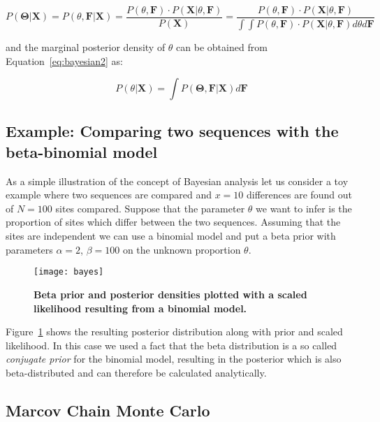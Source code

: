\begin{equation}
P\left(\mathbf{\Theta}|\mathbf{X}\right)=P\left(\theta,\mathbf{F}|\mathbf{X}\right)=\frac{P\left(\theta,\mathbf{F}\right)\cdot P\left(\mathbf{X}|\theta,\mathbf{F}\right)}{P\left(\mathbf{X}\right)}=\frac{P\left(\theta,\mathbf{F}\right)\cdot P\left(\mathbf{X}|\theta,\mathbf{F}\right)}{\int\int P(\theta,\mathbf{F})\cdot P\left(\mathbf{X}|\theta,\mathbf{F}\right)d\theta d\mathbf{F}}
\label{eq:bayesian2}
\end{equation}

\noindent
and the marginal posterior density of $\theta$ can be obtained from Equation~\ref{eq:bayesian2} as:

\begin{equation}
P\left(\theta|\mathbf{X}\right)=\int P\left(\mathbf{\Theta},\mathbf{F}|\mathbf{X}\right)d\mathbf{F}
\label{eq:bayesian3}
\end{equation}

\subsection{Example: Comparing two sequences with the beta-binomial model}

As a simple illustration of the concept of Bayesian analysis let us consider a toy example where two sequences are compared and $x=10$ differences are found out of $N=100$ sites compared.
Suppose that the parameter $\theta$ we want to infer is the proportion of sites which differ between the two sequences.
Assuming that the sites are independent we can use a binomial model and put a beta prior with parameters $\alpha=2$, $\beta=100$ on the unknown proportion $\theta$.

\begin{figure}[H]
\centering
\texttt{[image: bayes]} 
\caption{
{ \footnotesize 
{\bf Beta prior and posterior densities plotted with a scaled likelihood resulting from a binomial model.} 
}%
}
\label{fig:bayes1}
\end{figure}

Figure~\ref{fig:bayes1} shows the resulting posterior distribution along with prior and scaled likelihood.
In this case we used a fact that the beta distribution is a so called \emph{conjugate prior} for the binomial model, resulting in the posterior which is also beta-distributed and can therefore be calculated analytically.

\subsection{Marcov Chain Monte Carlo\label{sub:MCMC}}

